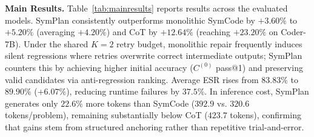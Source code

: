 \documentclass[runningheads]{llncs}
\begin{document}
\begin{table}[t]
\centering
\caption{Fine-grained accuracy (\%) across difficulty levels and subjects on MATH-500 for Qwen2.5-Coder-7B and Qwen3-8B.}
\label{tab:stratified}
\renewcommand{\arraystretch}{0.88}
\end{table}

\textbf{Main Results.} Table~\ref{tab:mainresults} reports results across the evaluated models. SymPlan consistently outperforms monolithic SymCode by $+3.60\%$ to $+5.20\%$ (averaging $+4.20\%$) and CoT by $+12.64\%$ (reaching $+23.20\%$ on Coder-7B). Under the shared $K=2$ retry budget, monolithic repair frequently induces silent regressions where retries overwrite correct intermediate outputs; SymPlan counters this by achieving higher initial accuracy ($C^{(0)}$ pass@1) and preserving valid candidates via anti-regression ranking. Average ESR rises from $83.83\%$ to $89.90\%$ ($+6.07\%$), reducing runtime failures by $37.5\%$. In inference cost, SymPlan generates only $22.6\%$ more tokens than SymCode ($392.9$ vs. $320.6$ tokens/problem), remaining substantially below CoT ($423.7$ tokens), confirming that gains stem from structured anchoring rather than repetitive trial-and-error.
\end{document}
